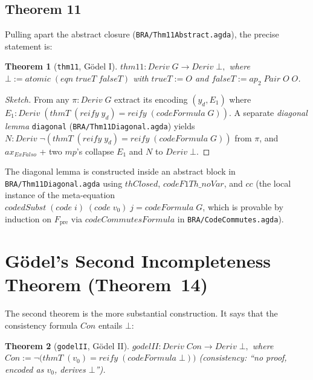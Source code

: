 \documentclass[11pt]{article}
\newtheorem{theorem}{Theorem}
\begin{document}
\subsection{Theorem 11}

Pulling apart the abstract closure (\verb|BRA/Thm11Abstract.agda|), the precise statement is:

\begin{theorem}[\texttt{thm11}, G\"odel I]
\label{thm:godel-I}
\(
  \mathit{thm11} : \mathit{Deriv}\;G \to \mathit{Deriv}\;\bot,
\)
where $\bot := \mathit{atomic}\;(\mathit{eqn}\;\mathit{trueT}\;\mathit{falseT})$ with $\mathit{trueT} := O$ and $\mathit{falseT} := \mathit{ap}_2\;\mathit{Pair}\;O\;O$.
\end{theorem}

\begin{proof}[Sketch]
From any $\pi : \mathit{Deriv}\;G$ extract its encoding $(y_d, E_1)$ where
$E_1 : \mathit{Deriv}\;(\mathit{thmT}\;(\mathit{reify}\;y_d) = \mathit{reify}\;(\mathit{codeFormula}\;G))$.
A separate \emph{diagonal lemma} \texttt{diagonal} (\verb|BRA/Thm11Diagonal.agda|)
yields $N : \mathit{Deriv}\;\neg(\mathit{thmT}\;(\mathit{reify}\;y_d) = \mathit{reify}\;(\mathit{codeFormula}\;G))$
from $\pi$, and $\mathit{ax}_{\mathit{ExFalso}}$ + two $\mathit{mp}$'s collapse $E_1$ and $N$ to $\mathit{Deriv}\;\bot$.
\end{proof}

The diagonal lemma is constructed inside an abstract block in
\verb|BRA/Thm11Diagonal.agda| using $\mathit{thClosed}$, $\mathit{codeF1Th\_noVar}$,
and $\mathit{cc}$ (the local instance of the meta-equation $\mathit{codedSubst}\;(\mathit{code}\;i)\;(\mathit{code}\;v_0)\;j = \mathit{codeFormula}\;G$,
which is provable by induction on $F_{\mathrm{pre}}$ via $\mathit{codeCommutesFormula}$ in \verb|BRA/CodeCommutes.agda|).

\section{G\"odel's Second Incompleteness Theorem (Theorem~14)}

The second theorem is the more substantial construction.  It says that
the consistency formula $\mathit{Con}$ entails $\bot$:

\begin{theorem}[\texttt{godelII}, G\"odel II]
\label{thm:godel-II}
\(
  \mathit{godelII} : \mathit{Deriv}\;\mathit{Con} \to \mathit{Deriv}\;\bot,
\)
where $\mathit{Con} := \neg\big(\mathit{thmT}\;(v_0) = \mathit{reify}\;(\mathit{codeFormula}\;\bot)\big)$
(consistency: ``no proof, encoded as $v_0$, derives $\bot$'').
\end{theorem}
\end{document}
